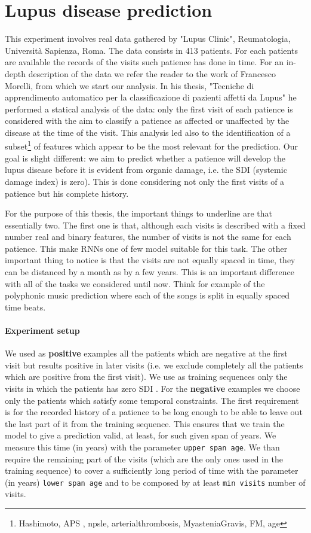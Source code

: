 \section{Lupus disease prediction}

This experiment involves real data gathered by "Lupus Clinic", Reumatologia, Università Sapienza, Roma. The data consists in 413 patients. For each patients are available the records of the visits such patience has done in time. For an in-depth description of the data we refer the reader to the work of Francesco Morelli, from which we start our analysis. In his thesis, "Tecniche di apprendimento automatico per la classificazione di pazienti affetti da Lupus" he performed a statical analysis of the data: only the first visit of each patience is considered with the aim to classify a patience as affected or unaffected by the disease at the time of the visit. This analysis led also to the identification of a subset\footnote{Hashimoto, APS , npsle, arterialthrombosis, MyasteniaGravis, FM, age} of features which appear to be the most relevant for the prediction. Our goal is slight different: we aim to predict whether a patience will develop the lupus disease before it is evident from organic damage, i.e. the SDI (systemic damage index) is zero). This is done considering not only the first visits of a patience but his complete history.

For the purpose of this thesis, the important things to underline are that essentially two. The first one is that,  although each visits is described with a fixed number real and binary features, the number of visits  is not the same for each patience. This make RNNs one of few model suitable for this task. The other important thing to notice is that the visits are not equally spaced in time, they can be distanced by a month as by a few years. This is an important difference with all of the tasks we considered until now. Think for example of the polyphonic music prediction where each of the songs is split in equally spaced time beats.

\paragraph{Experiment setup}
We used as \textbf{positive} examples all the patients which are negative at the first visit but results positive in later visits (i.e. we exclude completely all the patients which are positive from the first visit). We use as training sequences only the visits in which the patients has zero SDI .
For the \textbf{negative} examples we choose only the patients which satisfy some temporal constraints. The first requirement is for the recorded history of a patience to be long enough to be able to leave out the last part of it from the training sequence. This ensures that we train the model to give a prediction valid, at least, for such given span of years. We measure this time (in years) with the parameter \texttt{upper span age}.  We than require the remaining part of the visits (which are the only ones used in the training sequence) to cover a sufficiently long period of time with the parameter (in years) \texttt{lower span age} and to be composed by at least \texttt{min visits} number of visits.

